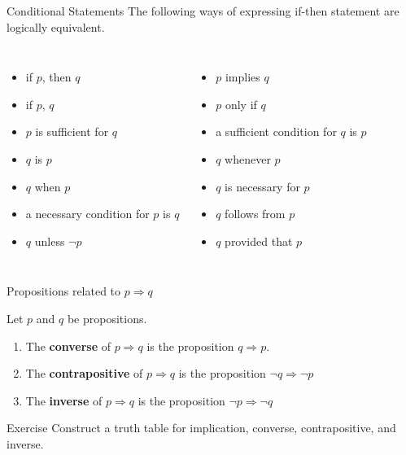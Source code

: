 \documentclass{beamer}
\begin{document}
\begin{frame}{Conditional Statements}
    The following ways of expressing if-then statement are logically equivalent. 

    \vspace{2mm}
    
    \begin{columns}
            \begin{itemize}
                \item if $p$, then $q$
                \item if $p$, $q$
                \item $p$ is sufficient for $q$
                \item $q$ is $p$
                \item $q$ when $p$
                \item a necessary condition for $p$ is $q$
                \item $q$ unless $\neg p$
            \end{itemize}
            \begin{itemize}
                \item $p$ implies $q$
                \item $p$ only if $q$
                \item a sufficient condition for $q$ is $p$
                \item $q$ whenever $p$
                \item $q$ is necessary for $p$
                \item $q$ follows from $p$
                \item $q$ provided that $p$
            \end{itemize}
    \end{columns}
\end{frame}

\begin{frame}[t]{Propositions related to $p \Rightarrow q$}
    \begin{definition}
        Let $p$ and $q$ be propositions. 
        \begin{enumerate}
            \item The \textbf{converse} of $p \Rightarrow q$ is the proposition $q \Rightarrow p$.
            \item The \textbf{contrapositive} of $p \Rightarrow q$ is the proposition $\neg q \Rightarrow \neg p$
            \item The \textbf{inverse} of $p \Rightarrow q$ is the proposition $\neg p \Rightarrow \neg q$
        \end{enumerate}
    \end{definition}
    \begin{block}{Exercise}
        Construct a truth table for implication, converse, contrapositive, and inverse. 
    \end{block}
\end{frame}
\end{document}
